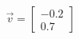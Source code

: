 \documentclass[preview]{standalone}
\begin{document}
\begin{align*}
\vec{v}=\begin{bmatrix}-0.2\\0.7\end{bmatrix}
\end{align*}
\end{document}
